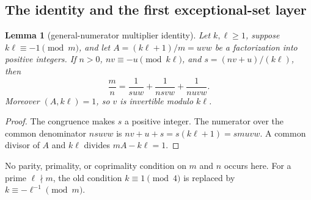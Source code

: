 \documentclass[10pt,reqno]{amsart}
\newtheorem{lemma}[theorem]{Lemma}
\theoremstyle{definition}
\newcommand{\1}{\mathbf 1}
\begin{document}
\subsection{The identity and the first exceptional-set layer}
\begin{lemma}[general-numerator multiplier identity]\label{lem:m-identity}
Let $k,\ell\geq1$, suppose $k\ell\equiv-1\pmod m$, and let
$A=(k\ell+1)/m=uvw$ be a factorization into positive integers.  If $n>0$, $nv\equiv-u\pmod{k\ell}$, and
$s=(nv+u)/(k\ell)$, then
\begin{equation}\tag{43.2}
 \frac mn=\frac1{suw}+\frac1{nsvw}+\frac1{nuvw}.
\end{equation}
Moreover $(A,k\ell)=1$, so $v$ is invertible modulo $k\ell$.
\end{lemma}
\begin{proof}
The congruence makes $s$ a positive integer.  The numerator over the common
denominator $nsuvw$ is
$nv+u+s=s(k\ell+1)=smuvw$.  A common divisor of $A$ and $k\ell$ divides
$mA-k\ell=1$.
\end{proof}
No parity, primality, or coprimality condition on $m$ and $n$ occurs here.
For a prime $\ell\nmid m$, the old condition $k\equiv1\pmod4$ is replaced
by $k\equiv-\ell^{-1}\pmod m$.
\end{document}
